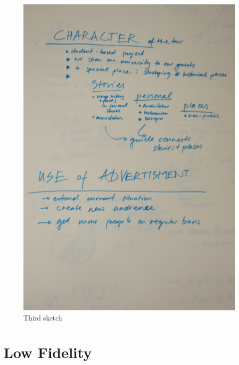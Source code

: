 \begin{appendices}
\begin{figure}[H]
    \centering
    \includegraphics[width=\textwidth,height=0.8\textheight]{Appendices/4/sk3}%
    \caption{Third sketch}%
    \label{app:Sk3}%
\end{figure}


\newpage

\chapter{Low Fidelity}

\setcounter{figure}{0}
\setcounter{table}{0}


\end{appendices}
